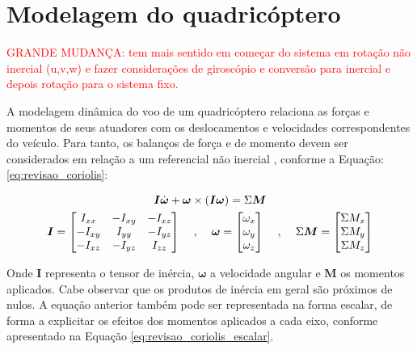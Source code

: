 \documentclass[main.tex]{subfiles}
\begin{document}
\chapter{Modelagem do quadricóptero}
\label{chap:modelagem}

\textcolor{red}{GRANDE MUDANÇA: tem mais sentido em começar do sistema em rotação não inercial (u,v,w) e fazer considerações de giroscópio e conversão para inercial e depois rotação para o sistema fixo.}

A modelagem dinâmica do voo de um quadricóptero relaciona as forças e momentos de seus atuadores com os deslocamentos e velocidades correspondentes do veículo. Para tanto, os balanços de força e de momento devem ser considerados em relação a um referencial não inercial \cite{classica:livro}, conforme a Equação: \ref{eq:revisao_coriolis}:

\begin{equation}\label{eq:revisao_coriolis}
    \begin{gathered}
        \boldsymbol{I}\dot{\boldsymbol{\omega}} + \boldsymbol{\omega}\times(\boldsymbol{I}\boldsymbol{\omega}) = \Sigma \boldsymbol{M}\\
        \boldsymbol{I} = \begin{bmatrix}
             I_{xx} & -I_{xy} & -I_{xz}\\
            -I_{xy} &  I_{yy} & -I_{yz}\\
            -I_{xz} & -I_{yz} & I_{zz}
        \end{bmatrix} \hspace{0.4cm},\hspace{0.4cm}
        \boldsymbol{\omega} = \begin{bmatrix}
            \omega_{x}\\
            \omega_{y}\\
            \omega_{z}
        \end{bmatrix} \hspace{0.4cm},\hspace{0.4cm}
        \Sigma\boldsymbol{M} = \begin{bmatrix}
            \Sigma M_{x}\\
            \Sigma M_{y}\\
            \Sigma M_{z}
        \end{bmatrix}
    \end{gathered}
\end{equation}

Onde $\boldsymbol{I}$ representa o tensor de inércia,  $\boldsymbol{\omega}$ a velocidade angular e $\boldsymbol{M}$ os momentos aplicados. Cabe observar que os produtos de inércia em geral são próximos de nulos. A equação anterior também pode ser representada na forma escalar, de forma a explicitar os efeitos dos momentos aplicados a cada eixo, conforme apresentado na Equação \ref{eq:revisao_coriolis_escalar}. 
\end{document}
